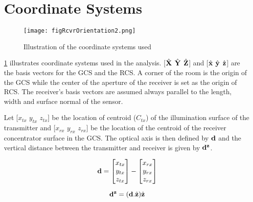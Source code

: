 \section{Coordinate Systems}
\label{sec:coordinate}
\graphicspath{{_Intro/Figures/}}

\begin{figure}[!b]
	\centering
		\texttt{[image: figRcvrOrientation2.png]}
	\caption{Illustration of the coordinate systems used}
	\label{fig:RcvrCoord}
\end{figure}

\figurename{ \ref{fig:RcvrCoord}} illustrates coordinate systems used in the analysis. [$\hat{\bf{X}}$ $\hat{\bf{Y}}$ $\hat{\bf{Z}}$] and [$\hat{\bf{x}}$ $\hat{\bf{y}}$ $\hat{\bf{z}}$] are the basis vectors for the GCS and the RCS. A corner of the room is the origin of the GCS while the center of the aperture of the receiver is set as the origin of RCS. The receiver's basis vectors are assumed always parallel to the length, width and surface normal of the sensor. 

Let [$x_{tx}$ $y_{tx}$ $z_{tx}$] be the location of centroid ($C_{tx}$) of the illumination surface of the transmitter and [$x_{rx}$ $y_{rx}$ $z_{rx}$] be the location of the centroid of the receiver concentrator surface in the GCS. The optical axis is then defined by ${\bf{d}}$ and the vertical distance between the transmitter and receiver is given by ${\bf{d}^{z}}$.

\begin{equation}
\label{eqOpAxis}
	{\bf{d}}=\left[ \begin{matrix} x_{tx}\\ y_{tx}\\ z_{tx} \end{matrix} \right] - \left[ \begin{matrix} x_{rx}\\ y_{rx}\\ z_{rx} \end{matrix} \right]
\end{equation}

\begin{equation}
\label{eqTxRxDist}
	{\bf{d}^{z}}=({\bf{d}}.{\hat{\bf{z}}}){\hat{\bf{z}}}
\end{equation}